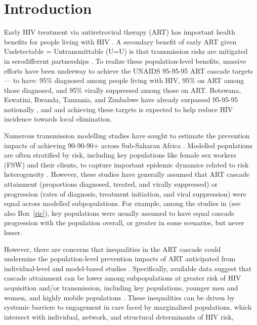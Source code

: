 \section{Introduction}\label{art.intro}
Early HIV treatment via antiretroviral therapy (ART) has important health benefits for people living with HIV \cite{Lundgren2015init}.
A secondary benefit of early ART given Undetectable = Untransmittable (U=U) is that
transmission risks are mitigated in serodifferent partnerships \cite{Cohen2016}.
To realize these population-level benefits, massive efforts have been underway to achieve
the UNAIDS 95-95-95 ART cascade targets \cite{UNAIDS2023} --- \ie to have:
95\% diagnosed among people living with HIV,
95\% on ART among those diagnosed, and
95\% virally suppressed among those on ART.
Botswana, Eswatini, Rwanda, Tanzania, and Zimbabwe
have already surpassed 95-95-95 nationally \cite{UNAIDS2023}, and
and achieving these targets is expected to help reduce HIV incidence towards local elimination.
\par
Numerous transmission modelling studies have sought to estimate
the prevention impacts of achieving 90-90-90+ across Sub-Saharan Africa
\cite{Eaton2012sys,Knight2022sr}.
Modelled populations are often stratified by risk,
including key populations like female sex workers (FSW) and their clients,
to capture important epidemic dynamics related to risk heterogeneity \cite{Watts2010}.
However, these studies have generally assumed that ART cascade
attainment (\ie proportions diagnosed, treated, and virally suppressed) or
progression (\ie rates of diagnosis, treatment initiation, and viral suppression)
were equal across modelled subpopulations.
For example, among the studies in \cite{Knight2022sr} (see also Box~\ref{ric}),
key populations were usually assumed to have
equal cascade progression with the population overall,
or greater in some scenarios, but never lesser.
\par
However, there are concerns that inequalities in the ART cascade
could undermine the population-level prevention impacts of ART
anticipated from individual-level and model-based studies
\cite{Baral2019,Green2020,Maheu-Giroux2024}.
Specifically, available data suggest that cascade attainment can be lower
among subpopulations at greater risk of HIV acquisition and/or transmission,
including key populations, younger men and women, and highly mobile populations
\cite{Hakim2018,Green2020}.
These inequalities can be driven by
systemic barriers to engagement in care faced by marginalized populations,
which intersect with individual, network, and structural determinants of HIV risk,
